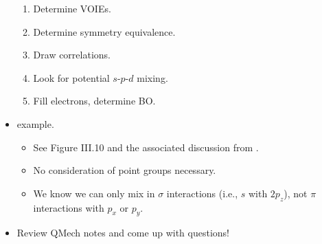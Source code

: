 \documentclass[../notes.tex]{subfiles}
\begin{document}
\begin{itemize}
\begin{enumerate}
        \item Determine VOIEs.
        \item Determine symmetry equivalence.
        \item Draw correlations.
        \item Look for potential $s$-$p$-$d$ mixing.
        \item Fill electrons, determine BO.
    \end{enumerate}
    \item {} example.
    \begin{itemize}
        \item See Figure III.10 and the associated discussion from \textcite{bib:CHEM20100Notes}.
        \item No consideration of point groups necessary.
        \item We know we can only mix in $\sigma$ interactions (i.e., $s$ with $2p_z$), not $\pi$ interactions with $p_x$ or $p_y$.
    \end{itemize}
    \item Review QMech notes and come up with questions!
\end{itemize}
\end{document}
